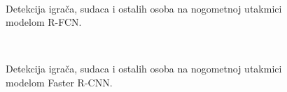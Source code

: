 \begin{figure}[h]
\begin{center}
 \\
\caption{Detekcija igrača, sudaca i ostalih osoba na nogometnoj utakmici modelom R-FCN.}
\label{nogomet_rfcn}
\end{center}
\end{figure}

\begin{figure}[h]
\begin{center}
 \\
\caption{Detekcija igrača, sudaca i ostalih osoba na nogometnoj utakmici modelom Faster R-CNN.}
\label{nogomet_faster}
\end{center}
\end{figure}

